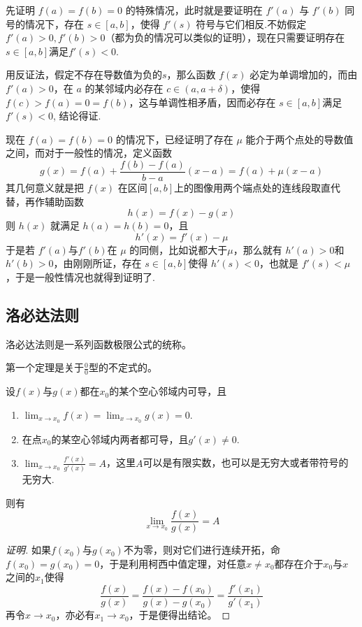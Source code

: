 先证明 $f(a)=f(b)=0$ 的特殊情况，此时就是要证明在 $f'(a)$ 与 $f'(b)$ 同号的情况下，存在 $s\in[a,b]$，使得 $f'(s)$ 符号与它们相反.不妨假定 $f'(a)>0, f'(b)>0$（都为负的情况可以类似的证明），现在只需要证明存在 $s\in[a,b]$满足$f'(s)<0$.

用反证法，假定不存在导数值为负的$s$，那么函数 $f(x)$ 必定为单调增加的，而由 $f'(a)>0$，在 $a$ 的某邻域内必存在 $c \in (a,a+\delta)$，使得 $f(c)>f(a)=0=f(b)$，这与单调性相矛盾，因而必存在 $s\in [a,b]$满足 $f'(s)<0$, 结论得证.

现在 $f(a)=f(b)=0$ 的情况下，已经证明了存在 $\mu$ 能介于两个点处的导数值之间，而对于一般性的情况，定义函数
\[ g(x) = f(a) +  \frac{f(b)-f(a)}{b-a} (x-a) = f(a) + \mu (x-a) \]
其几何意义就是把 $f(x)$ 在区间$[a,b]$上的图像用两个端点处的连线段取直代替，再作辅助函数
\[ h(x) = f(x) - g(x) \]
则 $h(x)$ 就满足 $h(a)=h(b)=0$，且
\[ h'(x) = f'(x) - \mu \]
于是若 $f'(a)$与$f'(b)$在 $\mu$ 的同侧，比如说都大于$\mu$，那么就有 $h'(a)>0$和$h'(b)>0$，由刚刚所证，存在 $s\in[a,b]$使得 $h'(s)<0$，也就是 $f'(s) < \mu$，于是一般性情况也就得到证明了.

\subsection{洛必达法则}
\label{sec:L'Hopital-rule}

洛必达法则是一系列函数极限公式的统称。

第一个定理是关于$\frac{0}{0}$型的不定式的。
\begin{theorem}
  设$f(x)$与$g(x)$都在$x_0$的某个空心邻域内可导，且
  \begin{enumerate}
  \item $\lim_{x \to x_0} f(x) = \lim_{x \to x_0} g(x) = 0$.
  \item 在点$x_0$的某空心邻域内两者都可导，且$g'(x) \neq 0$.
  \item $\lim_{x \to x_0} \frac{f'(x)}{g'(x)}=A$，这里$A$可以是有限实数，也可以是无穷大或者带符号的无穷大.
  \end{enumerate}
  则有
  \[ \lim_{x \to x_0} \frac{f(x)}{g(x)} = A \]
\end{theorem}

\begin{proof}[证明]
  如果$f(x_0)$与$g(x_0)$不为零，则对它们进行连续开拓，命$f(x_0)=g(x_0)=0$，于是利用柯西中值定理，对任意$x \neq x_0$都存在介于$x_0$与$x$之间的$x_1$使得
  \[ \frac{f(x)}{g(x)} = \frac{f(x)-f(x_0)}{g(x)-g(x_0)} = \frac{f'(x_1)}{g'(x_1)} \]
  再令$x \to x_0$，亦必有$x_1 \to x_0$，于是便得出结论。
\end{proof}

